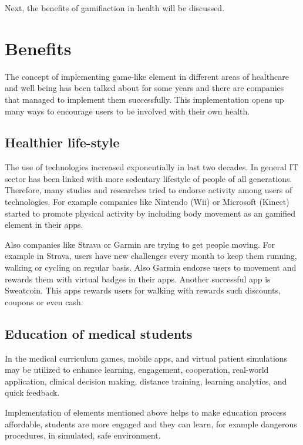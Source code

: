 \documentclass[10pt,twoside,english,a4paper]{article}
\begin{document}
Next, the benefits of gamifiaction in health will be discussed.

%
%
%

\section{Benefits} \label{benefits}
The concept of implementing game-like element in different areas of healthcare and well being has been talked about for some years and there are companies that managed to implement them successfully. This implementation opens up many ways to encourage users to be involved with their own health.  

\subsection{Healthier life-style } \label{lifestyle}
The use of technologies increased exponentially in last two decades. In general IT sector has been linked with more sedentary lifestyle of people of all generations. Therefore, many studies and researches tried to endorse activity among users of technologies\cite{GONZALEZ2016529}. For example companies like Nintendo (Wii) or Microsoft (Kinect) started to promote physical activity by including body movement as an gamified element in their apps.  

Also companies like Strava or Garmin are trying to get people moving. For example in Strava, users have new challenges every month to keep them running, walking or cycling on regular basis. Also Garmin endorse users to movement and rewards them with virtual badges in their apps. Another successful app is Sweatcoin. This apps rewards users for walking with rewards such discounts, coupons or even cash. 

\subsection{Education of medical students} \label{stuff}
In the medical curriculum games, mobile apps, and virtual patient simulations may be utilized to enhance learning, engagement, cooperation, real-world application, clinical decision making, distance training, learning analytics, and quick feedback\cite {https://doi.org/10.1002/ca.23916}.

Implementation of elements mentioned above helps to make education process affordable, students are more engaged and they can learn, for example dangerous procedures, in simulated, safe  environment.
\end{document}
